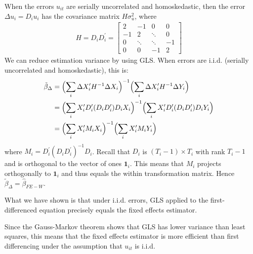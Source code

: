 When the errors $u_{it}$ are serially uncorrelated and homoskedastic, then the error $\Delta u_i = D_i u_i$ has the covariance matrix $H \sigma_u^2$,
where
\begin{gather*}
    H = D_i D_i^{\prime} = \begin{bmatrix}
        2 & -1 & 0 & 0 \\
        -1 & 2 & \ddots & 0 \\
        0 & \ddots & \ddots & -1 \\
        0 & 0 & -1 & 2
    \end{bmatrix}
\end{gather*}
We can reduce estimation variance by using GLS.
When errors are i.i.d. (serially uncorrelated and homoskedastic),
this is:
\begin{align*}
    \tilde{\beta}_{\Delta} &= \Bigl( \sum_{i} \Delta X_i^{\prime} H^{-1} \Delta X_i \Bigr)^{-1} \Bigl( \sum_{i} \Delta X_i^{\prime} H^{-1} \Delta Y_i \Bigr) \\
                  &= \Bigl( \sum_{i} X_i^{\prime} D_i^{\prime} (D_i D_i^{\prime}) D_i X_i \Bigr)^{-1} \Bigl( \sum_{i} X_i^{\prime} D_i^{\prime} (D_i D_i^{\prime}) D_i Y_i \Bigr) \\
                  &= \Bigl( \sum_{i} X_i^{\prime} M_i X_i \Bigr)^{-1} \Bigl( \sum_{i} X_i^{\prime} M_i Y_i \Bigr)
\end{align*}
where $M_i = D_i^{\prime} (D_i D_i^{\prime})^{-1} D_i$.
Recall that $D_i$ is $(T_i - 1) \times T_i$ with rank $T_i - 1$ and is orthogonal to the
vector of ones $\mathbf{1}_i$. This means that $M_i$ projects orthogonally to $\mathbf{1}_i$ 
and thus equals the within transformation matrix.
Hence $\tilde{\beta}_{\Delta} = \hat{\beta}_{FE-W}.$

What we have shown is that under i.i.d. errors, 
GLS applied to the first-differenced equation precisely
equals the fixed effects estimator.

Since the Gauss-Markov theorem shows that GLS has lower variance than least squares,
this means that the fixed effects estimator is more efficient than first differencing
under the assumption that $u_{it}$ is i.i.d.